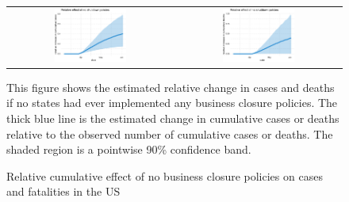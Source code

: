 \documentclass[3p, longtitle]{elsarticle}
\theoremstyle{definition}
\begin{document}
\begin{figure}[ht]
  \caption{Relative cumulative effect  of no business closure policies on cases and fatalities in the US  \label{fig:US-nb-dgrowth}}
  \begin{minipage}{\linewidth}
    \centering
    \begin{tabular}{cc}
%
      \includegraphics[width=0.45\textwidth]{tables_and_figures/us-index-rcumu_idx}
      & \includegraphics[width=0.45\textwidth]{tables_and_figures/us-index-rcumu_deaths_idx}
    \end{tabular}
    \begin{flushleft}
      \footnotesize This figure shows the estimated relative change in
      cases and deaths if no states had ever implemented any business closure
      policies. The thick blue line is the estimated change in cumulative
      cases or deaths relative to the observed number of cumulative cases
      or deaths. The shaded region is a pointwise 90\% confidence
      band.
    \end{flushleft}
  \end{minipage}
\end{figure}
\end{document}
